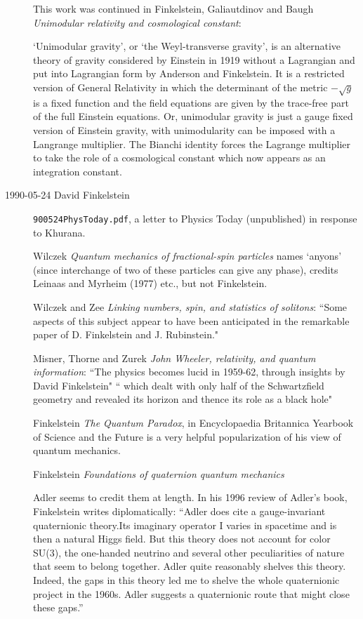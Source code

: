 \begin{description}
This work was continued in
Finkelstein, Galiautdinov and Baugh
{\em Unimodular relativity and cosmological constant}:

`Unimodular gravity', or `the Weyl-transverse gravity', is an alternative
theory of gravity considered by Einstein in 1919 without a Lagrangian and
put into Lagrangian form by Anderson and Finkelstein. It is
a restricted version of General Relativity in which the determinant of
the metric $-\sqrt{g}$ is a fixed function and the field equations are
given by the trace-free part of the full Einstein equations. Or,
unimodular gravity is just a gauge  fixed version of Einstein gravity,
with unimodularity can be imposed with a Langrange multiplier.  The
Bianchi identity forces the Lagrange multiplier to take the role of a
cosmological constant which now appears as an integration constant.


\item[1990-05-24 David Finkelstein] \texttt{900524PhysToday.pdf}, a
letter to Physics Today (unpublished) in response to Khurana.

Wilczek {\em Quantum mechanics of fractional-spin
particles} names `anyons' (since interchange of two of these particles
can give any phase), credits  Leinaas and Myrheim (1977) etc., but not
Finkelstein.

Wilczek and Zee
{\em Linking numbers, spin, and statistics of solitons}:
``Some aspects of this subject appear to have been anticipated in the
remarkable paper of D. Finkelstein and J. Rubinstein."

Misner, Thorne and Zurek
{\em {John Wheeler}, relativity, and quantum information}:
``The physics becomes lucid in 1959-62, through insights by David
Finkelstein"
`` which dealt with only half of the Schwartzfield geometry and revealed
its horizon and thence its role as a black hole"

Finkelstein {\em The Quantum Paradox},
in {Encyclopaedia Britannica} {Yearbook of Science and the Future}
is a very helpful popularization of his view of quantum mechanics.

Finkelstein \etal{}
{\em Foundations of quaternion quantum mechanics}

Adler seems to credit them at length. In his 1996 review of
Adler's book, Finkelstein writes diplomatically: ``Adler
does cite a gauge-invariant quaternionic theory.Its imaginary operator
I varies in spacetime and is then a natural Higgs field. But this
theory does not account for color SU(3), the one-handed neutrino and
several other peculiarities of nature that seem to belong together.
Adler quite reasonably shelves this theory. Indeed, the gaps in this
theory led me to shelve the whole quaternionic project in the 1960s.
Adler suggests a quaternionic route that might close these gaps.''


\end{description}
